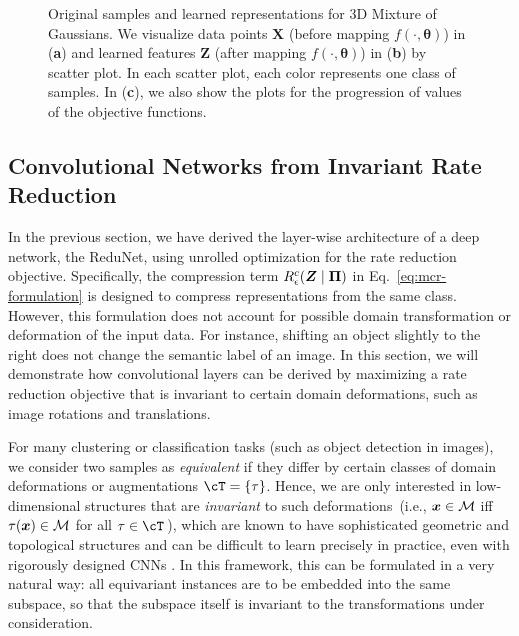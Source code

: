 \documentclass[../../book-main.tex]{subfiles}
\begin{document}
\begin{example}
\begin{figure}[t]
\begin{subfigure}[t]{0.32\textwidth}
    \end{subfigure}
    \vspace{-0.1in}
    \caption{\small Original samples  and learned representations for 3D Mixture of Gaussians. We visualize data points $\bm{X}$ (before mapping $f(\cdot, \bm{\theta})$) in (\textbf{a}) and learned features $\bm{Z}$ (after mapping $f(\cdot, \bm{\theta})$) in (\textbf{b}) by scatter plot. In each scatter plot, each color represents one class of samples. In (\textbf{c}), we also show the plots for the progression of values of the objective functions.}
    \label{fig:redu-3d-gaussian-diagram}
\end{figure}

\end{example}

\subsection{Convolutional Networks from Invariant Rate Reduction}\label{sec:shift-invariant}

In the previous section, we have derived the layer-wise architecture of a deep network, the ReduNet, using unrolled optimization for the rate reduction objective. 
Specifically, the compression term $R^c_\epsilon(\bm{Z} \mid\bm \Pi)$ in Eq.~\eqref{eq:mcr-formulation} is designed to compress representations from the same class. However, this formulation does not account for possible domain transformation or deformation of the input data. For instance, shifting an object slightly to the right does not change the semantic label of an image.  In this section, we will demonstrate how convolutional layers can be derived by maximizing a rate reduction objective that is invariant to certain domain deformations, such as image rotations and translations. 


For many clustering or classification tasks (such as object detection in images), we consider two samples as {\em equivalent} if they differ by certain classes of domain deformations or augmentations $\cT = \{\tau \}$. Hence, we are only interested in low-dimensional structures that are {\em invariant} to such deformations~(i.e., $\bm{x} \in \mathcal{M}$ iff $\tau(\bm{x}) \in \mathcal{M}$ for all $\tau \in \cT$\,), 
which are known to have sophisticated geometric and topological structures and can be difficult to learn precisely in practice, even with rigorously designed CNNs \cite{Cohen-ICML-2016}. 
In this framework, this can be formulated in a very natural way: all equivariant instances are to be embedded into the same subspace, so that the subspace itself is invariant to the transformations under consideration.
\end{document}
